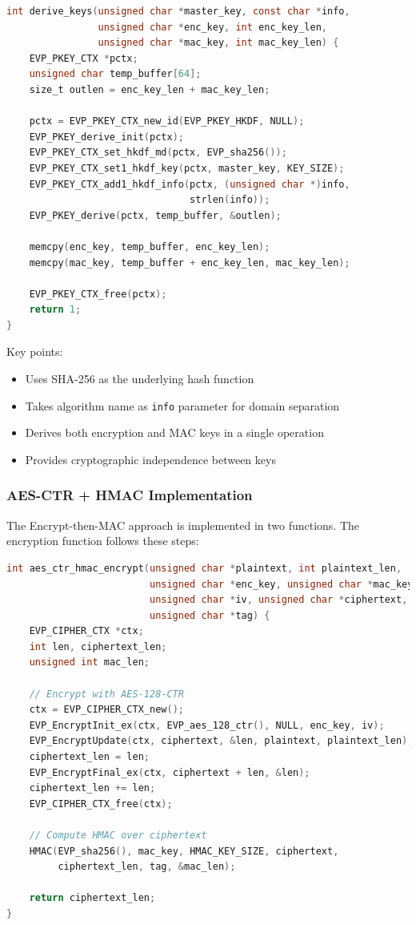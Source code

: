 \documentclass[12pt,a4paper]{article}
\begin{document}
\begin{lstlisting}[language=C, caption=HKDF key derivation]
int derive_keys(unsigned char *master_key, const char *info, 
                unsigned char *enc_key, int enc_key_len,
                unsigned char *mac_key, int mac_key_len) {
    EVP_PKEY_CTX *pctx;
    unsigned char temp_buffer[64];
    size_t outlen = enc_key_len + mac_key_len;
    
    pctx = EVP_PKEY_CTX_new_id(EVP_PKEY_HKDF, NULL);
    EVP_PKEY_derive_init(pctx);
    EVP_PKEY_CTX_set_hkdf_md(pctx, EVP_sha256());
    EVP_PKEY_CTX_set1_hkdf_key(pctx, master_key, KEY_SIZE);
    EVP_PKEY_CTX_add1_hkdf_info(pctx, (unsigned char *)info, 
                                strlen(info));
    EVP_PKEY_derive(pctx, temp_buffer, &outlen);
    
    memcpy(enc_key, temp_buffer, enc_key_len);
    memcpy(mac_key, temp_buffer + enc_key_len, mac_key_len);
    
    EVP_PKEY_CTX_free(pctx);
    return 1;
}
\end{lstlisting}

Key points:
\begin{itemize}
    \item Uses SHA-256 as the underlying hash function
    \item Takes algorithm name as \texttt{info} parameter for domain separation
    \item Derives both encryption and MAC keys in a single operation
    \item Provides cryptographic independence between keys
\end{itemize}

\subsubsection{AES-CTR + HMAC Implementation}
The Encrypt-then-MAC approach is implemented in two functions. The encryption function follows these steps:

\begin{lstlisting}[language=C, caption=AES-CTR + HMAC encryption (key steps)]
int aes_ctr_hmac_encrypt(unsigned char *plaintext, int plaintext_len,
                         unsigned char *enc_key, unsigned char *mac_key,
                         unsigned char *iv, unsigned char *ciphertext,
                         unsigned char *tag) {
    EVP_CIPHER_CTX *ctx;
    int len, ciphertext_len;
    unsigned int mac_len;
    
    // Encrypt with AES-128-CTR
    ctx = EVP_CIPHER_CTX_new();
    EVP_EncryptInit_ex(ctx, EVP_aes_128_ctr(), NULL, enc_key, iv);
    EVP_EncryptUpdate(ctx, ciphertext, &len, plaintext, plaintext_len);
    ciphertext_len = len;
    EVP_EncryptFinal_ex(ctx, ciphertext + len, &len);
    ciphertext_len += len;
    EVP_CIPHER_CTX_free(ctx);
    
    // Compute HMAC over ciphertext
    HMAC(EVP_sha256(), mac_key, HMAC_KEY_SIZE, ciphertext, 
         ciphertext_len, tag, &mac_len);
    
    return ciphertext_len;
}
\end{lstlisting}
\end{document}
